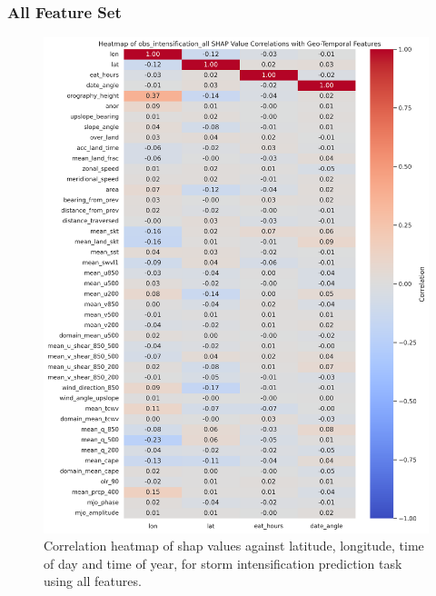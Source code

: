 \subsubsection{All Feature Set}
\begin{figure}[ht]
    \centering
    \includegraphics[width=\textwidth]{../figures/generated/experiments/obs_intensification/obs_intensification_all_shap_correlation_heatmap.png}
    \caption{Correlation heatmap of \acrshort{shap} values against latitude, longitude, time of day and time of year, for storm intensification prediction task using all features.}
    \label{fig:obs_intensification_all_shap_heatmap}
\end{figure}

